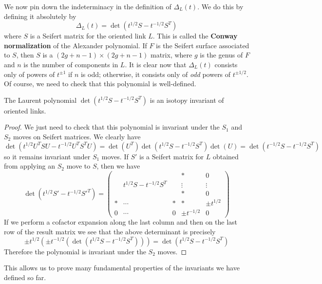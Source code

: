 We now pin down the indeterminacy in the definition of $\Delta_L(t)$. We do this by defining it absolutely by
\[ \Delta_L(t) = \det(t^{1/2}S-t^{-1/2}S^T) \]
where $S$ is a Seifert matrix for the oriented link $L$. This is called the \textbf{Conway normalization} of the Alexander polynomial. If $F$ is the Seifert surface associated to $S$, then $S$ is a $(2g+n-1) \times (2g+n-1)$ matrix, where $g$ is the genus of $F$ and $n$ is the number of components in $L$. It is clear now that $\Delta_L(t)$ consists only of powers of $t^{\pm 1}$ if $n$ is odd; otherwise, it consists only of \emph{odd} powers of $t^{\pm 1/2}$. Of course, we need to check that this polynomial is well-defined.

\begin{prop}
The Laurent polynomial $\det(t^{1/2}S-t^{-1/2}S^T)$ is an isotopy invariant of oriented links.
\end{prop}
\begin{proof}
We just need to check that this polynomial is invariant under the $S_1$ and $S_2$ moves on Seifert matrices. We clearly have
\[ \det(t^{1/2}U^TSU - t^{-1/2}U^TS^TU) = \det(U^T)\det(t^{1/2}S-t^{-1/2}S^T)\det(U) = \det(t^{-1/2}S-t^{-1/2}S^T) \]
so it remains invariant under $S_1$ moves. If $S'$ is a Seifert matrix for $L$ obtained from applying an $S_2$ move to $S$, then we have
\[ \det(t^{1/2}S'-t^{-1/2}S'^T) = \begin{pmatrix} & & & * & 0 \\ & t^{1/2}S-t^{-1/2}S^T & & \vdots & \vdots \\ & & & * & 0 \\ * & \cdots & * & * & \pm t^{1/2} \\ 0 & \cdots & 0 & \pm t^{-1/2} & 0 \end{pmatrix} \]
If we perform a cofactor expansion along the last column and then on the last row of the result matrix we see that the above determinant is precisely
\[ \pm t^{1/2} \left( \pm t^{-1/2} \left( \det(t^{1/2}S - t^{-1/2}S^T) \right) \right) = \det(t^{1/2}S - t^{-1/2}S^T) \]
Therefore the polynomial is invariant under the $S_2$ moves.
\end{proof}

This allows us to prove many fundamental properties of the invariants we have defined so far.


